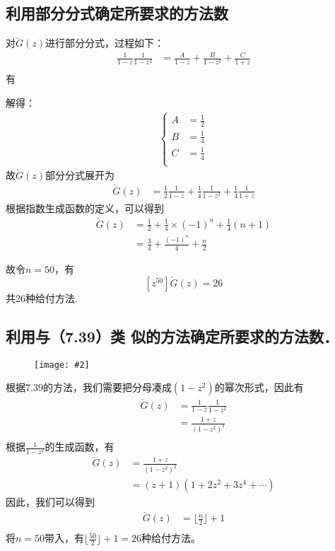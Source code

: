 \documentclass[]{article}
\newcommand{\image}[2]{\begin{figure}[H]\texttt{[image: \#2]}\end{figure}}
\begin{document}
\subsection*{利用部分分式确定所要求的方法数}

对$\check{G}(z)$进行部分分式，过程如下：
\begin{align}
    \frac{1}{1-z}\frac{1}{1-z^2} &= \frac{A}{1-z} + \frac{B}{1-z^2} + \frac{C}{1+z}\\
\end{align}
有
    
解得：
\begin{gather*}
    \left\{
    \begin{aligned}
        A &= \frac{1}{2}\\
        B &= \frac{1}{4}\\
        C &= \frac{1}{4}\\
    \end{aligned}
    \right.
\end{gather*}
故$\check{G}(z)$部分分式展开为
\begin{align}
    \check{G}(z) &= \frac{1}{2}\frac{1}{1-z} + \frac{1}{4}\frac{1}{1-z^2} + \frac{1}{4}\frac{1}{1+z}
\end{align}
根据指数生成函数的定义，可以得到
\begin{align}
    [z^n]\check{G}(z) &= \frac{1}{2} + \frac{1}{4} \times (-1)^n + \frac{1}{4}(n+1)\\
    &= \frac{3}{4} + \frac{(-1)^n}{4} + \frac{n}{2}
\end{align}

故令$n=50$，有$$[z^{50}]\check{G}(z) = 26$$
共26种给付方法.\par 

\subsection*{利用与（7.39）类 似的方法确定所要求的方法数．}
\image{0.3}{2023-05-12-15-32-02.png}
根据7.39的方法，我们需要把分母凑成$(1-z^2)$的幂次形式，因此有
\begin{align}
    \check{G}(z) &= \frac{1}{1-z}\frac{1}{1-z^2} \\
    &= \frac{1+z}{(1-z^2)^2}\\
\end{align}
根据$\frac{1}{1-z^2}$的生成函数，有
\begin{align}
    \check{G}(z) &= \frac{1+z}{(1-z^2)^2}\\
    &= (z+1)(1+2z^2+3z^4 + \cdots)
\end{align}
因此，我们可以得到
\begin{align}
    [z^n]\check{G}(z) &= \lfloor \frac{n}{2} \rfloor + 1 \\
\end{align}
将$n=50$带入，有$\lfloor \frac{50}{2} \rfloor + 1 = 26$种给付方法。\par

\end{document}
